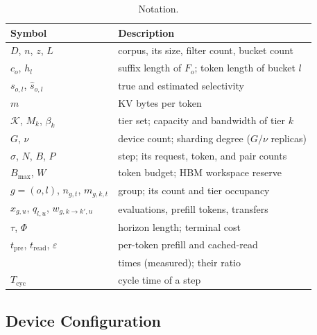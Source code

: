 \documentclass[10pt,twocolumn]{article}
\newcommand{\Tcyc}{T_{\mathrm{cyc}}}
\newcommand{\Bmax}{B_{\max}}
\newcommand{\shat}{\hat{s}}
\newcommand{\eps}{\varepsilon}
\begin{document}
\begin{table}[t]
\centering
\small
\begin{tabular}{ll}
\toprule
Symbol & Description \\
\midrule
$D$, $n$, $z$, $L$ & corpus, its size, filter count, bucket count \\
$c_o$, $h_l$ & suffix length of $F_o$; token length of bucket $l$ \\
$s_{o,l}$, $\shat_{o,l}$ & true and estimated selectivity \\
$m$ & KV bytes per token \\
$\mathcal{K}$, $M_k$, $\beta_k$ & tier set; capacity and bandwidth of tier $k$ \\
$G$, $\nu$ & device count; sharding degree ($G/\nu$ replicas) \\
$\sigma$, $N$, $B$, $P$ & step; its request, token, and pair counts \\
$\Bmax$, $W$ & token budget; HBM workspace reserve \\
$g{=}(o,l)$, $n_{g,t}$, $m_{g,k,t}$ & group; its count and tier occupancy \\
$x_{g,u}$, $q_{l,u}$, $w_{g,k\to k',u}$ & evaluations, prefill tokens, transfers \\
$\tau$, $\Phi$ & horizon length; terminal cost \\
$t_{\mathrm{pre}}$, $t_{\mathrm{read}}$, $\eps$ & per-token prefill and cached-read \\
 & \quad times (measured); their ratio \\
$\Tcyc$ & cycle time of a step \\
\bottomrule
\end{tabular}
\caption{Notation.}
\label{tab:notation}
\end{table}

\subsection{Device Configuration}
\label{sec:devices}
\end{document}

